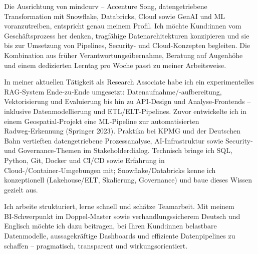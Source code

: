 Die Ausrichtung von mindcurv – Accenture Song, datengetriebene Transformation mit Snowflake, Databricks, Cloud sowie GenAI und ML voranzutreiben, entspricht genau meinem Profil. Ich möchte Kund:innen vom Geschäftsprozess her denken, tragfähige Datenarchitekturen konzipieren und sie bis zur Umsetzung von Pipelines, Security- und Cloud-Konzepten begleiten. Die Kombination aus früher Verantwortungsübernahme, Beratung auf Augenhöhe und einem dedizierten Lerntag pro Woche passt zu meiner Arbeitsweise.

In meiner aktuellen Tätigkeit als Research Associate habe ich ein experimentelles RAG‑System Ende‑zu‑Ende umgesetzt: Datenaufnahme/-aufbereitung, Vektorisierung und Evaluierung bis hin zu API‑Design und Analyse‑Frontends – inklusive Datenmodellierung und ETL/ELT‑Pipelines. Zuvor entwickelte ich in einem Geospatial‑Projekt eine ML‑Pipeline zur automatisierten Radweg‑Erkennung (Springer 2023). Praktika bei KPMG und der Deutschen Bahn vertieften datengetriebene Prozessanalyse, AI‑Infrastruktur sowie Security‑ und Governance‑Themen im Stakeholderdialog. Technisch bringe ich SQL, Python, Git, Docker und CI/CD sowie Erfahrung in Cloud‑/Container‑Umgebungen mit; Snowflake/Databricks kenne ich konzeptionell (Lakehouse/ELT, Skalierung, Governance) und baue dieses Wissen gezielt aus.

Ich arbeite strukturiert, lerne schnell und schätze Teamarbeit. Mit meinem BI‑Schwerpunkt im Doppel‑Master sowie verhandlungssicherem Deutsch und Englisch möchte ich dazu beitragen, bei Ihren Kund:innen belastbare Datenmodelle, aussagekräftige Dashboards und effiziente Datenpipelines zu schaffen – pragmatisch, transparent und wirkungsorientiert.